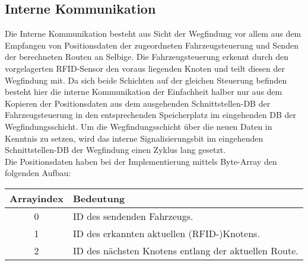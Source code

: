 	\subsection{Interne Kommunikation}
		\label{Interne Kommunikation}
		Die Interne Kommunikation besteht aus Sicht der Wegfindung vor allem aus dem Empfangen von Positionsdaten der zugeordneten Fahrzeugsteuerung und Senden der berechneten Routen an Selbige. Die Fahrzeugsteuerung erkennt durch den vorgelagerten \ac{RFID}-Sensor den voraus liegenden Knoten und teilt diesen der Wegfindung mit. Da sich beide Schichten auf der gleichen Steuerung befinden besteht hier die interne Kommunikation der Einfachheit halber nur aus dem Kopieren der Positionsdaten aus dem ausgehenden Schnittstellen-\ac{DB} der Fahrzeugsteuerung in den entsprechenden Speicherplatz im eingehenden \ac{DB} der Wegfindungsschicht. Um die Wegfindungsschicht über die neuen Daten in Kenntnis zu setzen, wird das interne Signalisierungsbit im eingehenden Schnittstellen-\ac{DB} der Wegfindung einen Zyklus lang gesetzt.
		\\
		Die Positionsdaten haben bei der Implementierung mittels Byte-Array den folgenden Aufbau:\\
		
		\begin{tabular}{| c | l |}
			\hline
			\textbf{Arrayindex} & \textbf{Bedeutung} \\ \hline \hline
			0 & ID des sendenden Fahrzeugs. \\ \hline
			1 & ID des erkannten aktuellen (\ac{RFID}-)Knotens. \\ \hline
			2 & ID des nächsten Knotens entlang der aktuellen Route. \\
			\hline
		\end{tabular}\\
		
